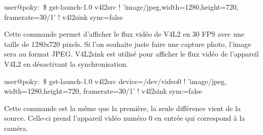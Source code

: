 \begin{tcolorbox}
user@poky:~\$ gst-launch-1.0 v4l2src ! 'image/jpeg,width=1280,height=720,
framerate=30/1' ! v4l2sink sync=false
\end{tcolorbox}

Cette commande permet d’afficher le flux vidéo de V4L2 en 30 FPS avec une taille de
1280x720 pixels. Si l’on souhaite juste faire une capture photo, l’image sera au format
JPEG. V4L2sink est utilisé pour afficher le flux vidéo de l’appareil V4L2 en désactivant la
synchronisation.

\begin{tcolorbox}
user@poky:~\$ gst-launch-1.0 v4l2src device=/dev/video0 ! 'image/jpeg,
width=1280,height=720, framerate=30/1' ! v4l2sink sync=false
\end{tcolorbox}

Cette commande est la même que la première, la seule différence vient de la source.
Celle-ci prend l’appareil vidéo numéro 0 en entrée qui correspond à la caméra.
